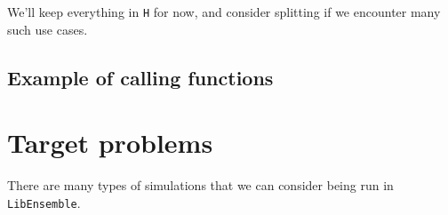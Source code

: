 \documentclass{article}
\newcommand{\libE}{\texttt{LibEnsemble}\xspace}
\begin{document}
We'll keep everything in \texttt{H} for now, and consider splitting if we
encounter many such use cases.

\clearpage
\subsection{Example of calling functions}


\clearpage


\clearpage
\section{Target problems}
There are many types of simulations that we can consider being run in \libE.
\end{document}
